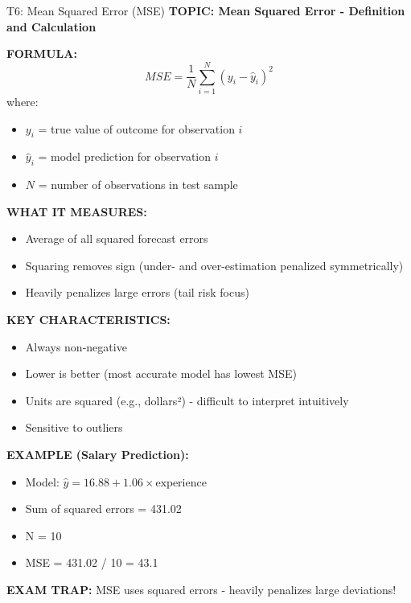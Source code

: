 \documentclass[8pt]{beamer}
\begin{document}
	
	\begin{frame}{T6: Mean Squared Error (MSE)}
		\fontsize{6.5}{7.5}\selectfont
		\textbf{TOPIC: Mean Squared Error - Definition and Calculation}
		
		\vspace{0.1cm}
		\textbf{FORMULA:}
		\[
		MSE = \frac{1}{N}\sum_{i=1}^N (y_i - \hat{y}_i)^2
		\]
		where:
		\begin{itemize}
			\item $y_i$ = true value of outcome for observation $i$
			\item $\hat{y}_i$ = model prediction for observation $i$
			\item $N$ = number of observations in test sample
		\end{itemize}
		
		\vspace{0.1cm}
		\textbf{WHAT IT MEASURES:}
		\begin{itemize}
			\item Average of all squared forecast errors
			\item Squaring removes sign (under- and over-estimation penalized symmetrically)
			\item \textcolor{myblue}{Heavily penalizes large errors} (tail risk focus)
		\end{itemize}
		
		\vspace{0.1cm}
		\textbf{KEY CHARACTERISTICS:}
		\begin{itemize}
			\item Always non-negative
			\item Lower is better (most accurate model has lowest MSE)
			\item Units are squared (e.g., dollars²) - difficult to interpret intuitively
			\item Sensitive to outliers
		\end{itemize}
		
		\vspace{0.1cm}
		\textbf{EXAMPLE (Salary Prediction):}
		\begin{itemize}
			\item Model: $\hat{y} = 16.88 + 1.06 \times \text{experience}$
			\item Sum of squared errors = 431.02
			\item N = 10
			\item MSE = 431.02 / 10 = 43.1
		\end{itemize}
		
		\textcolor{myred}{\textbf{EXAM TRAP:}} MSE uses \textcolor{myblue}{squared errors} - heavily penalizes large deviations!
	\end{frame}
	
\end{document}
